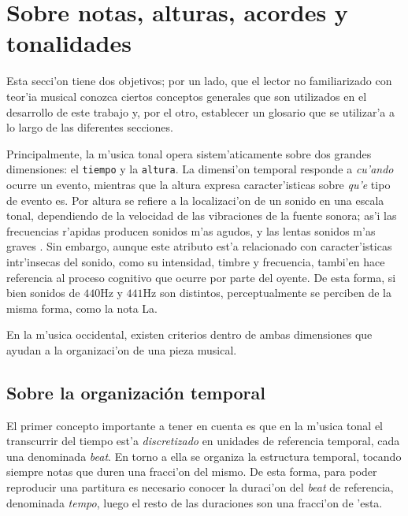 \section{Sobre notas, alturas, acordes y tonalidades}
\label{sec:musical_intro}
Esta secci'on tiene dos objetivos; por un lado, que el lector no familia\-rizado con teor'ia musical conozca
ciertos conceptos generales que son utilizados en el desarrollo de este trabajo y, por el otro, establecer un glosario
que se utilizar'a a lo largo de las diferentes secciones.

Principalmente, la m'usica tonal opera sistem'aticamente sobre dos grandes dimensiones: el \texttt{tiempo} y la \texttt{altura}. 
La dimensi'on temporal responde a \emph{cu'ando} ocurre un evento, mientras que la altura expresa caracter'isticas sobre \emph{qu'e}
tipo de evento es. Por altura se refiere a la localizaci'on de un sonido en una escala tonal, dependiendo de la velocidad de las vibraciones de la fuente sonora; 
as'i las frecuencias r'apidas producen sonidos m'as agudos, y las lentas sonidos m'as graves \citep[p. 565]{kennedy1996oxford}.
Sin embargo, aunque este atributo est'a relacionado con caracter'isticas intr'insecas del sonido, como su intensidad, timbre y frecuencia, 
tambi'en hace referencia
al proceso cognitivo que ocurre por parte del oyente. De esta forma, si bien sonidos de $440\mbox{Hz}$ y $441\mbox{Hz}$ son distintos, 
perceptualmente se perciben de la misma forma, como la nota La.

En la m'usica occidental, existen criterios dentro de ambas dimensiones que ayudan a la organizaci'on de una pieza musical. 


\subsection{Sobre la organizaci\'on temporal}
\label{sec:temporal_organization}

El primer concepto importante a tener en cuenta es que en la m'usica tonal el transcurrir del tiempo est'a \emph{discretizado} en unidades de referencia 
temporal, cada una denominada \emph{beat}. En torno a ella se organiza la estructura temporal, tocando
siempre notas que duren una fracci'on del mismo. De esta forma, para poder reproducir una partitura es necesario conocer 
la duraci'on del \emph{beat} de referencia, denominada \emph{tempo}, luego el resto de las duraciones son una fracci'on de 'esta.


